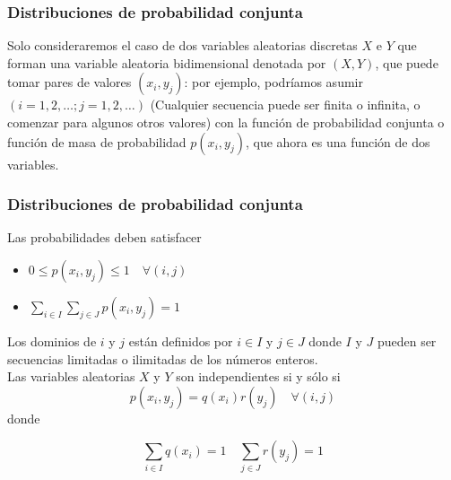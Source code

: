\documentclass[spanish]{beamer}
\begin{document}
\begin{frame}
\frametitle{Distribuciones de probabilidad conjunta}
Solo consideraremos el caso de dos variables aleatorias discretas $X$ e $Y$ que forman una variable aleatoria bidimensional denotada por $(X, Y)$, que puede tomar pares de valores $(x_{i}, y_{j})$: por ejemplo, podríamos asumir $(i = 1, 2,\ldots; j = 1, 2,\ldots)$ (Cualquier secuencia puede ser finita o infinita, o comenzar para algunos otros valores) con la función de probabilidad conjunta o función de masa de
probabilidad $p(x_{i}, y_{j})$, que ahora es una función de dos variables. 
\end{frame}
\begin{frame}
\frametitle{Distribuciones de probabilidad conjunta}
Las probabilidades deben satisfacer
\begin{itemize}
\item $0\leq p(x_{i}, y_{j})\leq 1 \quad \forall (i,j)$
\item $\displaystyle \sum_{i\in I} \sum_{j\in J} p(x_{i},y_{j})=1$
\end{itemize}
Los dominios de $i$ y $j$ están definidos por $i\in I$ y $j\in J$ donde $I$ y $J$ pueden ser secuencias limitadas o ilimitadas de los números enteros.
\newline
\\
Las variables aleatorias $X$ y $Y$ son independientes si y sólo si 
\begin{equation*}
p(x_{i},y_{j})=q(x_{i})r(y_{j})  \quad \forall (i,j)
\end{equation*}
donde 

\begin{equation*}
\sum_{i\in I} q(x_{i})=1 \quad \sum_{j\in J} r(y_{j})=1   
\end{equation*}

\end{frame}
\end{document}
